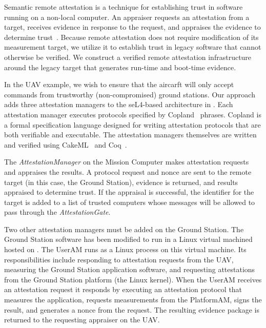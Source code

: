 Semantic remote attestation is a technique for  establishing
trust in software running on a non-local computer.  
An appraiser requests an attestation from
a target, receives evidence in response to the request, and appraises
the evidence to determine
trust~\cite{Haldar:04:Semantic-Remote,Coker::Principles-of-R}. Because
remote attestation does not require modification of its measurement
target, we utilize it to establish trust in legacy software
that cannot otherwise be verified.  We construct a verified remote
attestation infrastructure around the legacy target that generates
run-time and boot-time evidence.

In the UAV example, we wish to ensure that the aircarft will only accept
commands from trustworthy (non-compromised) ground stations.  
Our approach adds three attestation managers to the seL4-based
architecture in .  Each attestation
manager executes protocols specified by Copland~\cite{Ramsdell:2019aa}
phrases.  Copland is a formal specification language designed for
writing attestation protocols that are both verifiable and executable.
The attestation managers themselves are written and verified using
CakeML~\cite{cakeml} and Coq~\cite{Bertot:2013aa}.

The \emph{AttestationManager} on the Mission Computer makes
attestation requests and appraises the results.  A protocol request and nonce are
sent to the remote target (in this case, the Ground Station), 
evidence is returned, and results appraised to
determine trust.  If the appraisal is successful, the identifier for the 
target is added to a list of trusted computers whose messages 
will be allowed to pass through the \emph{AttestationGate}.  

Two other attestation managers must be added on the Ground Station.  
The Ground Station software has been modified to run in a Linux virtual 
machined hosted on \selFour.  
The UserAM runs as a Linux process on this virtual machine.  Its
responsibilities include responding to attestation requests from the UAV, 
measuring the Ground Station application software, and requesting
attestations from the Ground Station platform (the Linux kernel).  When the UserAM receives an
attestation request it responds by executing an attestation protocol
that measures the application, requests measurements from the
PlatformAM, signs the result, and generates a nonce from the request.  The
resulting evidence package is returned to the requesting appraiser on the UAV.

